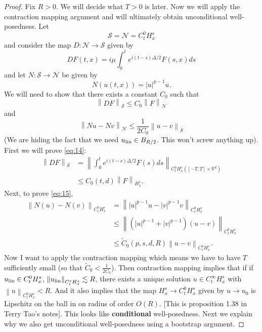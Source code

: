 \documentclass{article}
\def\R{\mathbb{R}} %
\newcommand\norm[1]{\left\lVert#1\right\rVert}
\begin{document}
\begin{proof}
  Fix $R>0$. We will decide what $T>0$ is later. Now we will apply the
  contraction mapping argument and will ultimately obtain unconditional
  well-posedness. Let
  \begin{equation*}
    \mathcal{S} = \mathcal{N} = C_{t}^{0}H_{x}^{s}
  \end{equation*}
  and consider the map $D:\mathcal{N} \to \mathcal{S}$ given by
  \begin{equation*}
    DF(t,x) = i\mu \int_{0}^{t}e^{i(t-s)\Delta/2}F(s,x)ds 
  \end{equation*}
  and let $N:\mathcal{S} \to \mathcal{N}$ be given by
  \begin{equation*}
    N(u(t,x)) = |u|^{p-1}u.
  \end{equation*}
  We will need to show that there exists a constant
  $C_{0}$ such that
  \begin{equation}\label{eq:14}
    \norm{DF}_{\mathcal{S}} \leq C_{0} \norm{F}_{\mathcal{N}}
  \end{equation}
  and 
  \begin{equation}\label{eq:15}
    \norm{Nu-Nv}_{\mathcal{N}} \leq  \frac{1}{2C_{0}}\norm{u-v}_{\mathcal{S}}
  \end{equation}
  (We are hiding the fact that we need $u_{\rm lin}\in B_{R/2}$. This won't
  screw anything up). First we will prove \cref{eq:14}:
  \begin{align*}
    \norm{DF}_{\mathcal{S}}
    &= \norm{\int_{0}^{t}e^{i(t-s)\Delta/2}F(s)ds }_{C_{t}^{0}H_{x}^{s}\left( [-T,T]\times \R^d \right)} \\
    &\leq C_{0}(t,d)\norm{F}_{H_{x}^{s}}.
  \end{align*}
  Next, to prove \cref{eq:15},
  \begin{align*}
    \norm{N(u)-N(v)}_{C_{t}^{0}H_{x}^{s}}
    &= \norm{|u|^{p-1}u-|v|^{p-1}v}_{C_{t}^{0}H_{x}^{s}}\\
    &\leq \norm{\left( |u|^{p-1}+|v|^{p-1} \right)\left(u-v\right)}_{C_{t}^{0}H_{x}^{s}}\\
    &\leq \tilde{C}_{0}(p,s,d,R)\norm{u-v}_{C_{t}^{0}H_{x}^{s}}.
  \end{align*}
  Now I want to apply the contraction mapping which means we have to have $T$
  sufficiently small (so that $\tilde{C}_{0}<\frac{1}{2C_{0}}$). Then
  contraction mapping implies that if if $u_{\rm lin }\in C_{t}^{0}H_{x}^{s}$,
  $\norm{u_{\rm lin}}_{C_{t}^{s}H_{x}^{s}}\lesssim R$, there exists a unique
  solution $u\in C_{t}^{\infty}H_{x}^{s}$ with
  $\norm{u}_{C_{t}^{0}H_{x}^{s}}<R$. And it also implies that the map
  $H_{x}^{s}\to C_{t}^{0}H_{x}^{s}$ given by $u \to u_{0}$ is Lipschitz on the
  ball in on radius of order $O(R)$. [This is proposition 1.38 in Terry Tao's
  notes]. This looks like \textbf{conditional} well-posedness. Next we explain
  why we also get unconditional well-posedness using a bootstrap argument. 


\end{proof}
\end{document}
